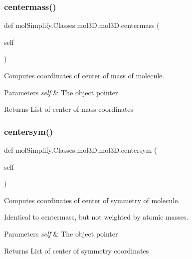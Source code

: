 \subsubsection{\texorpdfstring{centermass()}{centermass()}}
{\footnotesize\ttfamily def mol\+Simplify.\+Classes.\+mol3\+D.\+mol3\+D.\+centermass (\begin{DoxyParamCaption}\item[{}]{self }\end{DoxyParamCaption})}



Computes coordinates of center of mass of molecule. 


\begin{DoxyParams}{Parameters}
{\em self} & The object pointer \\
\hline
\end{DoxyParams}
\begin{DoxyReturn}{Returns}
List of center of mass coordinates 
\end{DoxyReturn}
\mbox{\label{classmolSimplify_1_1Classes_1_1mol3D_1_1mol3D_a0e4c145ac4c16e7be70cec1a3e03f6b7}} 
\subsubsection{\texorpdfstring{centersym()}{centersym()}}
{\footnotesize\ttfamily def mol\+Simplify.\+Classes.\+mol3\+D.\+mol3\+D.\+centersym (\begin{DoxyParamCaption}\item[{}]{self }\end{DoxyParamCaption})}



Computes coordinates of center of symmetry of molecule. 

Identical to centermass, but not weighted by atomic masses. 
\begin{DoxyParams}{Parameters}
{\em self} & The object pointer \\
\hline
\end{DoxyParams}
\begin{DoxyReturn}{Returns}
List of center of symmetry coordinates 
\end{DoxyReturn}
\mbox{\label{classmolSimplify_1_1Classes_1_1mol3D_1_1mol3D_a8c96247d4d06ac9d1b241af45e79d94a}} 
